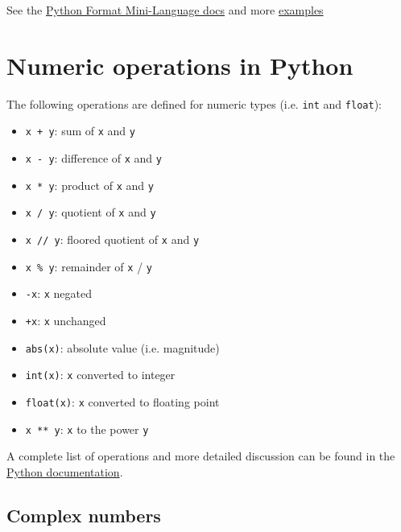 \documentclass[12pt]{article} \newif\ifsolution\solutiontrue %
\begin{document}
See the \href{https://docs.python.org/3/library/string.html#format-specification-mini-language}{Python Format Mini-Language docs} and more \href{https://docs.python.org/3/library/string.html#format-examples}{examples}


\section{Numeric operations in
Python}\label{numeric-operations-in-python}

The following operations are defined for numeric types (i.e.
\texttt{int} and \texttt{float}):

{\begin{multicols}{2}
\begin{itemize}
\item
  \texttt{x\ +\ y}: sum of \texttt{x} and \texttt{y}
\item
  \texttt{x\ -\ y}: difference of \texttt{x} and \texttt{y}
\item
  \texttt{x\ *\ y}: product of \texttt{x} and \texttt{y}
\item
  \texttt{x\ /\ y}: quotient of \texttt{x} and \texttt{y}
\item
  \texttt{x\ //\ y}: floored quotient of \texttt{x} and \texttt{y}
\item
  \texttt{x\ \%\ y}: remainder of \texttt{x} / \texttt{y}
\item
  \texttt{-x}: \texttt{x} negated
\item
  \texttt{+x}: \texttt{x} unchanged
\item
  \texttt{abs(x)}: absolute value (i.e. magnitude)
\item
  \texttt{int(x)}: \texttt{x} converted to integer
\item
  \texttt{float(x)}: \texttt{x} converted to floating point
\item
  \texttt{x\ **\ y}: \texttt{x} to the power \texttt{y}
\end{itemize}
\end{multicols}
}

A complete list of operations and more detailed discussion can be found
in the
\href{https://docs.python.org/3/library/stdtypes.html\#numeric-types-int-float-complex}{Python
documentation}.

\subsection{Complex numbers}\label{complex-numbers}
\end{document}
